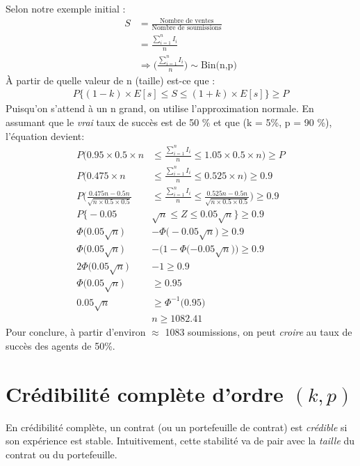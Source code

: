 \documentclass[11pt,french]{report}
\begin{document}
Selon notre exemple initial :
\begin{align*}
S &= \frac{\text{Nombre de ventes}}{\text{Nombre de soumissions}} \\
&= \frac{\sum_{i = 1}^{n} I_{i}}{n} \\
& \Rightarrow \Bigg(\frac{\sum_{i = 1}^{n} I_{i}}{n} \Bigg) \sim \text{Bin(n,p)}
\end{align*}
À partir de quelle valeur de n (taille) est-ce que :
\begin{align*}
P \Big \lbrace(1 - k) \times E[s] \leq S \leq(1 + k)\times E[s]\Big\rbrace \geq P
\end{align*}
Puisqu'on s'attend à un n grand, on utilise l'approximation normale. En assumant que le \textit{vrai} taux de succès est de 50 \% et que (k = 5\%, p = 90 \%), l'équation devient:
\begin{align*}
P\Bigg(0.95 \times  0.5 \times  n &\leq \frac{\sum_{i = 1}^{n} I_{i}}{n} \leq 1.05 \times  0.5 \times  n \Bigg) \geq P\\
P\Bigg(0.475 \times  n &\leq \frac{\sum_{i = 1}^{n} I_{i}}{n} \leq 0.525 \times  n\Bigg) \geq0.9 \\
P\Bigg( \frac{0.475n - 0.5n}{\sqrt{n \times  0.5 \times 0.5}} &\leq \frac{\sum_{i = 1}^{n} I_{i}}{n} \leq \frac{0.525n - 0.5n}{\sqrt{n \times  0.5 \times 0.5}}\Bigg) \geq0.9 \\
P \Big \lbrace -0.05 &\sqrt{n} \leq Z \leq 0.05\sqrt{n} \Big \rbrace \geq 0.9 \\
\Phi \big (0.05 \sqrt{n}) &- \Phi\big (-0.05 \sqrt{n}\big) \geq0.9 \\
\Phi\big (0.05 \sqrt{n}\big) &- \Big(1 - \Phi(-0.05 \sqrt{n}\big)\Big) \geq0.9 \\
2 \Phi\big (0.05 \sqrt{n}\big) &- 1 \geq0.9 \\
\Phi\big (0.05 \sqrt{n}\big) & \geq 0.95 \\
0.05 \sqrt{n} & \geq \Phi^{-1}\big (0.95\big) \\
&n \geq 1082.41
\end{align*}
Pour conclure, à partir d'environ $\approx$ 1083  soumissions, on peut \textit{croire} au taux de succès des agents de 50\%.

\section{Crédibilité complète d'ordre $(k,p)$}
En crédibilité complète, un contrat (ou un portefeuille de contrat) est \emph{crédible} si son expérience est stable. Intuitivement, cette stabilité va de pair avec la \emph{taille} du contrat ou du portefeuille.
\end{document}
